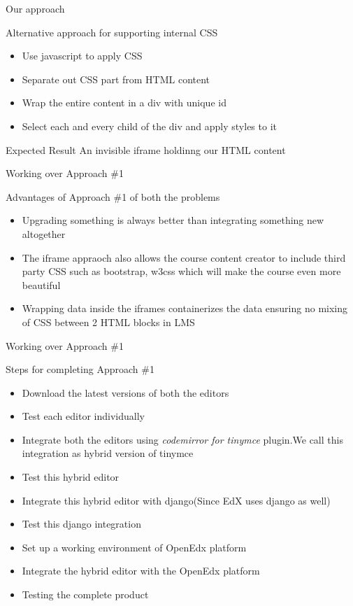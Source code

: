 \documentclass{beamer}
\begin{document}
	\begin{frame}{Our approach }
		\begin{block}{Alternative approach for supporting internal CSS }
			\begin{itemize}
				\item Use javascript to apply CSS
				\item Separate out CSS part from HTML content
				\item Wrap the entire content in a div with unique id
				\item Select each and every child of the div and apply styles to it
			\end{itemize}
		\end{block}
		\begin{block}{Expected Result}
			An invisible iframe holdinng our HTML content
		\end{block}
	\end{frame}
	
	\begin{frame}{Working over Approach \#1}
		\begin{block}{Advantages of Approach \#1 of both the problems}
			\begin{itemize}
				\item Upgrading something is always better than integrating something new altogether
				\item The iframe appraoch also allows the course content creator to include third party CSS such as bootstrap, w3css which will make the course even more beautiful
				\item Wrapping data inside the iframes containerizes the data ensuring no mixing of CSS between 2 HTML blocks in LMS
			\end{itemize}
		\end{block}
	\end{frame}
	
	\begin{frame}{Working over Approach \#1}
		\begin{block}{Steps for completing Approach \#1}
			\begin{itemize}
				\item Download the latest versions of both the editors
				\item Test each editor individually
				\item Integrate both the editors using \textit{codemirror for tinymce} plugin.We call this integration as hybrid version of tinymce
				\item Test this hybrid editor
				\item Integrate this hybrid editor with django(Since EdX uses django as well)
				\item Test this django integration
				\item Set up a working environment of OpenEdx platform
				\item Integrate the hybrid editor with the OpenEdx platform
				\item Testing the complete product
			\end{itemize}
		\end{block}
	\end{frame}
	
\end{document}
